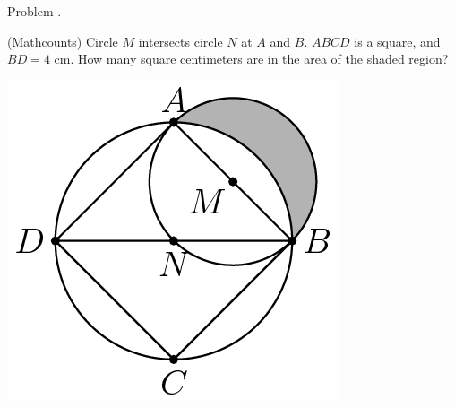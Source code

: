 \documentclass[9pt]{beamer}
\newcounter{problem}[section]
\begin{document}
\begin{frame}[t, fragile]{Problem \thesection.\theproblem}
    \begin{block}{}
    (Mathcounts) Circle $M$ intersects circle $N$ at $A$ and $B$. $ABCD$ is a square, and $BD = 4$ cm. How many square centimeters are in the area of the shaded region?
    \end{block}
    \begin{center}
        \includegraphics[scale=0.4]{20829b5b2d00796ffd69be6a0a67bde0b0a29dda.png}
    \end{center} 
    
\end{frame}
\end{document}
